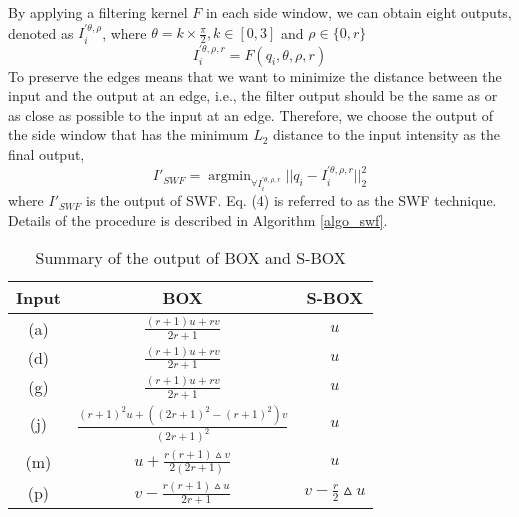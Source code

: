 \documentclass[10pt,twocolumn,letterpaper]{article}
\begin{document}
By applying a filtering kernel $F$ in each side window, we can obtain eight outputs, denoted as $I_{i}^{'\theta,\rho}$, where $ \theta=k\times\frac{\pi}{2}, k\in[0,3]$ and $\rho\in\{0, r\}$
\begin{equation}
I_{i}^{'\theta,\rho,r} = F(q_i,\theta,\rho,r)
\end{equation}
To preserve the edges means that we want to minimize the distance between the input and the output at an edge, i.e., the filter output should be the same as or as close as possible to the input at an edge. Therefore, we choose the output of the side window that has the minimum $L_2$ distance to the input intensity as the final output, 
\begin{equation}
I'_{SWF} = \mathop{arg min}_{\forall I_{i}^{'\theta,\rho,r}}||q_{i}-I_{i}^{'\theta,\rho,r}||_2^2
\end{equation}
where $I'_{SWF}$ is the output of SWF. Eq. (4) is referred to as the SWF technique. Details of the procedure is described in Algorithm \ref{algo_swf}.
\begin{table}[htbp]
	\centering
	\caption{Summary of the output of BOX and S-BOX}
	\begin{tabular}{|c|c|c|}
		\hline
		Input&BOX&S-BOX\\
		\hline
		(a)&$\frac{(r+1)u+rv}{2r+1}$&$u$\\
		\hline
		(d)&$\frac{(r+1)u+rv}{2r+1}$&$u$\\
		\hline
		(g)&$\frac{(r+1)u+rv}{2r+1}$&$u$\\
		\hline
		(j)&$\frac{(r+1)^2u+((2r+1)^2-(r+1)^2)v}{(2r+1)^2}$&$u$\\
		\hline
		(m)&$u+\frac{r(r+1)\vartriangle{v}}{2(2r+1)}$&$u$\\
		\hline
		(p)&$v-\frac{r(r+1)\vartriangle{u}}{2r+1}$&$v-\frac{r}{2}\vartriangle{u}$\\
		\hline
	\end{tabular}
	\label{boxandsbox}
\end{table}
\end{document}
